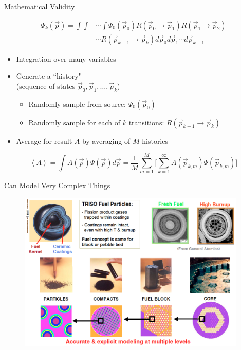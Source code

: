 \documentclass[xcolor=x11names,compress, handout]{beamer}
\renewcommand{\(}{\begin{columns}}
\renewcommand{\)}{\end{columns}}
\newcommand{\<}[1]{\begin{column}{#1}}
\renewcommand{\>}{\end{column}}
\begin{document}
\begin{frame}{Mathematical Validity}

\begin{align*}
\Psi_{k}(\vec{p}) = \int\int &\cdots \int \Psi_{0}(\vec{p}_{0}) R(\vec{p}_{0} \rightarrow \vec{p}_{1})R(\vec{p}_{1} \rightarrow \vec{p}_{2}) \\&\cdots R(\vec{p}_{k-1} \rightarrow \vec{p}_{k}) d\vec{p}_{0} d\vec{p}_{1} \cdots d\vec{p}_{k-1}
\end{align*}

\begin{itemize}
\item Integration over many variables
\hspace*{0.5 em}
\item Generate a ``history"\\
(sequence of states $\vec{p}_0, \vec{p}_1 , \dots, \vec{p}_k$)
\begin{itemize}
 \item Randomly sample from source: $\Psi_0 (\vec{p}_0)$
 \item Randomly sample for each of $k$ transitions: $R(\vec{p}_{k-1} \rightarrow \vec{p}_{k})$
\end{itemize}
\pause
\item Average for result $A$ by averaging of $M$ histories
\end{itemize}

\[\left\langle A \right\rangle = \int A(\vec{p})\Psi(\vec{p}) d\vec{p} 
= \frac{1}{M} \sum_{m=1}^M \biggl[ \sum_{k=1}^{\infty} A(\vec{p}_{k,m}) \Psi(\vec{p}_{k,m}) \biggr] \]

\end{frame}


\begin{frame}{Can Model Very Complex Things}

  	\begin{figure}
  	\begin{center}
  		\includegraphics[height=3in,clip]{pbmr}
	\end{center}
  	\end{figure}

\end{frame}
\end{document}

